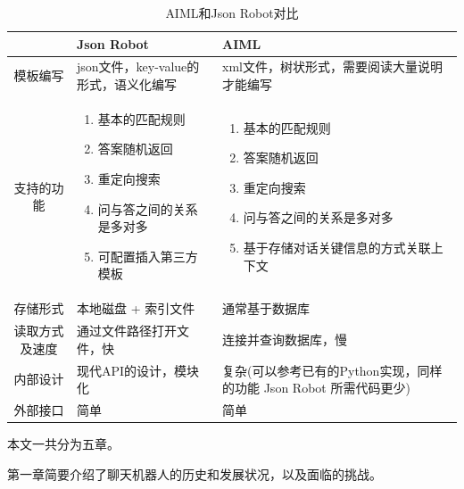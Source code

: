 \documentclass[bachelor,winfonts]{jnuthesis}
\begin{document}
\begin{table}[ht!]
  \centering
  \begin{tabular}{cp{38mm}p{38mm}}
    \toprule
    \textbf{} & \textbf{Json Robot} & \textbf{AIML}\\
    \midrule
    模板编写  & json文件，key-value的形式，语义化编写 &  xml文件，树状形式，需要阅读大量说明才能编写   \\
    \hline
    支持的功能     & 
    \begin{enumerate}
    \item 基本的匹配规则
    \item 答案随机返回
    \item 重定向搜索
    \item 问与答之间的关系是多对多
    \item 可配置插入第三方模板
    \end{enumerate} &
    \begin{enumerate}
    \item 基本的匹配规则
    \item 答案随机返回
    \item 重定向搜索
    \item 问与答之间的关系是多对多
    \item 基于存储对话关键信息的方式关联上下文
    \end{enumerate} \\
    \hline
    存储形式     & 本地磁盘 + 索引文件    &  通常基于数据库   \\
    \hline
    读取方式及速度     & 通过文件路径打开文件，快     & 连接并查询数据库，慢 \\
    \hline
    内部设计    & 现代API的设计，模块化   &  复杂(可以参考已有的Python实现，同样的功能 Json Robot 所需代码更少)   \\
    外部接口    & 简单   &  简单\\
    \bottomrule
  \end{tabular}
  \caption{AIML和Json Robot对比}\label{table:t1}
\end{table}

本文一共分为五章。

第一章简要介绍了聊天机器人的历史和发展状况，以及面临的挑战。
\end{document}
